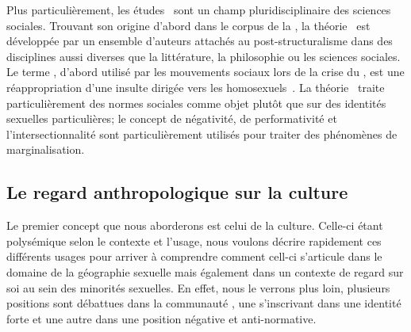 Plus particulièrement, les études \qus\ sont un champ pluridisciplinaire des sciences sociales. 
Trouvant son origine d'abord dans le corpus de la , la théorie \qu\ est développée par un ensemble d'auteurs attachés au post-structuralisme dans des disciplines aussi diverses que la littérature, la philosophie ou les sciences sociales. 
Le terme \qu, d'abord utilisé par les mouvements sociaux \lgbt{} lors de la crise du \sida, est une réappropriation d'une insulte dirigée vers les homosexuels~\citep{Laprade2014}.
La théorie \qu\ traite particulièrement des normes sociales comme objet plutôt que sur des identités sexuelles particulières; le concept de négativité, de performativité et l'intersectionnalité sont particulièrement utilisés pour traiter des phénomènes de marginalisation.

\subsection{Le regard anthropologique sur la culture}
\label{subsec:le_regard_anthropologique_sur_la_culture} 
Le premier concept que nous aborderons est celui de la culture. 
Celle-ci étant polysémique selon le contexte et l'usage, nous voulons décrire rapidement ces différents usages pour arriver à comprendre comment cell-ci s'articule dans le domaine de la géographie sexuelle mais également dans un contexte de regard sur soi au sein des minorités sexuelles. 
En effet, nous le verrons plus loin, plusieurs positions sont débattues dans la communauté \lgbt{}, une s'inscrivant dans une identité forte et une autre dans une position négative et anti-normative.


